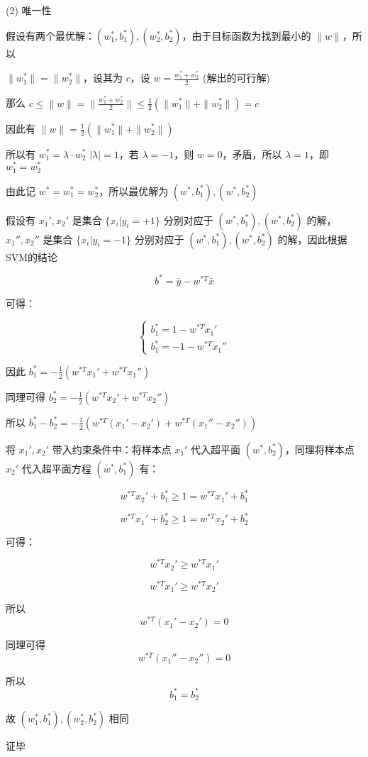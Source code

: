 (2) 唯一性

假设有两个最优解：$(w_1^*, b_1^*), (w_2^*, b_2^*)$，由于目标函数为找到最小的 $\|w\|$，所以

$\|w_1^*\| = \|w_2^*\|$，设其为 $c$，设 $w = \frac{w_1^* + w_2^*}{2}$ (解出的可行解)

那么 $c \leq \|w\| = \|\frac{w_1^* + w_2^*}{2}\| \leq \frac{1}{2}(\|w_1^*\| + \|w_2^*\|) = c$

因此有 $\|w\| = \frac{1}{2}(\|w_1^*\| + \|w_2^*\|)$

所以有 $w_1^* = \lambda \cdot w_2^*$ $|\lambda| = 1$，若 $\lambda = -1$，则 $w = 0$，矛盾，所以 $\lambda = 1$，即 $w_1^* = w_2^*$

由此记 $w^* = w_1^* = w_2^*$，所以最优解为 $(w^*, b_1^*), (w^*, b_2^*)$

假设有 $x_1', x_2'$ 是集合 $\{x_i|y_i = +1\}$ 分别对应于 $(w^*, b_1^*), (w^*, b_2^*)$ 的解，$x_1'', x_2''$ 是集合 $\{x_i|y_i = -1\}$ 分别对应于 $(w^*, b_1^*), (w^*, b_2^*)$ 的解，因此根据SVM的结论

\[b^* = \bar{y} - w^{*T}\bar{x}\]

可得：

\[\begin{cases} 
b_1^* = 1 - w^{*T}x_1' \\
b_1^* = -1 - w^{*T}x_1''
\end{cases}\]

因此 $b_1^* = -\frac{1}{2}(w^{*T}x_1' + w^{*T}x_1'')$

同理可得 $b_2^* = -\frac{1}{2}(w^{*T}x_2' + w^{*T}x_2'')$

所以 $b_1^* - b_2^* = -\frac{1}{2}(w^{*T}(x_1' - x_2') + w^{*T}(x_1'' - x_2''))$

将 $x_1', x_2'$ 带入约束条件中：将样本点 $x_1'$ 代入超平面 $(w^*, b_2^*)$，同理将样本点 $x_2'$ 代入超平面方程 $(w^*, b_1^*)$ 有：

\[w^{*T}x_2' + b_1^* \geq 1 = w^{*T}x_1' + b_1^*\]

\[w^{*T}x_1' + b_2^* \geq 1 = w^{*T}x_2' + b_2^*\]

可得：

\[w^{*T}x_2' \geq w^{*T}x_1'\]

\[w^{*T}x_1' \geq w^{*T}x_2'\]

所以 \[w^{*T}(x_1' - x_2') = 0\]

同理可得 \[w^{*T}(x_1'' - x_2'') = 0\]

所以 \[b_1^* = b_2^*\]

故 $(w_1^*, b_1^*), (w_2^*, b_2^*)$ 相同

证毕

